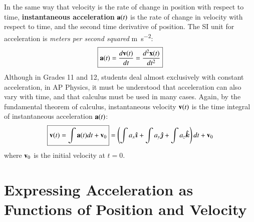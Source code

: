 \documentclass{../../oss-handout}
\newcommand{\mb}[1]{\ensuremath\mathbf{#1}}
\begin{document}
In the same way that velocity is the rate of change in position with respect
to time, \textbf{instantaneous acceleration} $\mb{a}(t)$ is the rate of change
in velocity with respect to time, and the second time derivative of position.
The SI unit for acceleration is \emph{meters per second squared}
\si{\metre\per\second^2}:
\begin{equation}
  \boxed{\mb{a}(t)= \frac{d\mb{v}(t)}{dt}=\frac{d^2\mb{x}(t)}{dt^2}}
\end{equation}
Although in Grades 11 and 12, students deal almost exclusively with constant
acceleration, in AP Physics, it must be understood that acceleration can also
vary with time, and that calculus must be used in many cases.
Again, by the fundamental theorem of calculus, instantaneous velocity
$\mb{v}(t)$ is the time integral of instantaneous acceleration $\mb{a}(t)$:
\begin{equation}
  \boxed{\mb{v}(t)=\int\mb{a}(t)dt+\mb{v}_0} =
    \left(\int a_x\bm{\hat{\imath}} +
    \int a_y\bm{\hat{\jmath}} +
    \int a_z\bm{\hat{k}}\right) dt +\mb{v}_0
\end{equation}
where $\mb{v}_0$ is the initial velocity at $t=0$.

\section{Expressing Acceleration as Functions of Position and Velocity}
\end{document}
